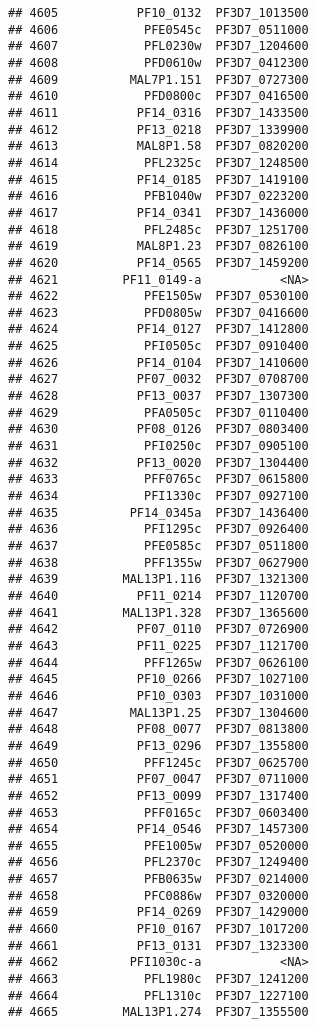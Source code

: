 \documentclass[12pt, a4paper]{article}\usepackage[]{graphicx}\usepackage[]{color}
\makeatletter
\newenvironment{kframe}{%
 \def\at@end@of@kframe{}%
 \ifinner\ifhmode%
  \def\at@end@of@kframe{\end{minipage}}%
  \begin{minipage}{\columnwidth}%
 \fi\fi%
 \def\FrameCommand##1{\hskip\@totalleftmargin \hskip-\fboxsep
 \colorbox{shadecolor}{##1}\hskip-\fboxsep
     \hskip-\linewidth \hskip-\@totalleftmargin \hskip\columnwidth}%
 \MakeFramed {\advance\hsize-\width
   \@totalleftmargin\z@ \linewidth\hsize
   \@setminipage}}%
 {\par\unskip\endMakeFramed%
 \at@end@of@kframe}
\newenvironment{knitrout}{}{} %
\makeatother
\begin{document}
\begin{knitrout}
\begin{kframe}
\begin{verbatim}
## 4605           PF10_0132  PF3D7_1013500
## 4606            PFE0545c  PF3D7_0511000
## 4607            PFL0230w  PF3D7_1204600
## 4608            PFD0610w  PF3D7_0412300
## 4609          MAL7P1.151  PF3D7_0727300
## 4610            PFD0800c  PF3D7_0416500
## 4611           PF14_0316  PF3D7_1433500
## 4612           PF13_0218  PF3D7_1339900
## 4613           MAL8P1.58  PF3D7_0820200
## 4614            PFL2325c  PF3D7_1248500
## 4615           PF14_0185  PF3D7_1419100
## 4616            PFB1040w  PF3D7_0223200
## 4617           PF14_0341  PF3D7_1436000
## 4618            PFL2485c  PF3D7_1251700
## 4619           MAL8P1.23  PF3D7_0826100
## 4620           PF14_0565  PF3D7_1459200
## 4621         PF11_0149-a           <NA>
## 4622            PFE1505w  PF3D7_0530100
## 4623            PFD0805w  PF3D7_0416600
## 4624           PF14_0127  PF3D7_1412800
## 4625            PFI0505c  PF3D7_0910400
## 4626           PF14_0104  PF3D7_1410600
## 4627           PF07_0032  PF3D7_0708700
## 4628           PF13_0037  PF3D7_1307300
## 4629            PFA0505c  PF3D7_0110400
## 4630           PF08_0126  PF3D7_0803400
## 4631            PFI0250c  PF3D7_0905100
## 4632           PF13_0020  PF3D7_1304400
## 4633            PFF0765c  PF3D7_0615800
## 4634            PFI1330c  PF3D7_0927100
## 4635          PF14_0345a  PF3D7_1436400
## 4636            PFI1295c  PF3D7_0926400
## 4637            PFE0585c  PF3D7_0511800
## 4638            PFF1355w  PF3D7_0627900
## 4639         MAL13P1.116  PF3D7_1321300
## 4640           PF11_0214  PF3D7_1120700
## 4641         MAL13P1.328  PF3D7_1365600
## 4642           PF07_0110  PF3D7_0726900
## 4643           PF11_0225  PF3D7_1121700
## 4644            PFF1265w  PF3D7_0626100
## 4645           PF10_0266  PF3D7_1027100
## 4646           PF10_0303  PF3D7_1031000
## 4647          MAL13P1.25  PF3D7_1304600
## 4648           PF08_0077  PF3D7_0813800
## 4649           PF13_0296  PF3D7_1355800
## 4650            PFF1245c  PF3D7_0625700
## 4651           PF07_0047  PF3D7_0711000
## 4652           PF13_0099  PF3D7_1317400
## 4653            PFF0165c  PF3D7_0603400
## 4654           PF14_0546  PF3D7_1457300
## 4655            PFE1005w  PF3D7_0520000
## 4656            PFL2370c  PF3D7_1249400
## 4657            PFB0635w  PF3D7_0214000
## 4658            PFC0886w  PF3D7_0320000
## 4659           PF14_0269  PF3D7_1429000
## 4660           PF10_0167  PF3D7_1017200
## 4661           PF13_0131  PF3D7_1323300
## 4662          PFI1030c-a           <NA>
## 4663            PFL1980c  PF3D7_1241200
## 4664            PFL1310c  PF3D7_1227100
## 4665         MAL13P1.274  PF3D7_1355500

\end{verbatim}
\end{kframe}
\end{knitrout}
\end{document}
